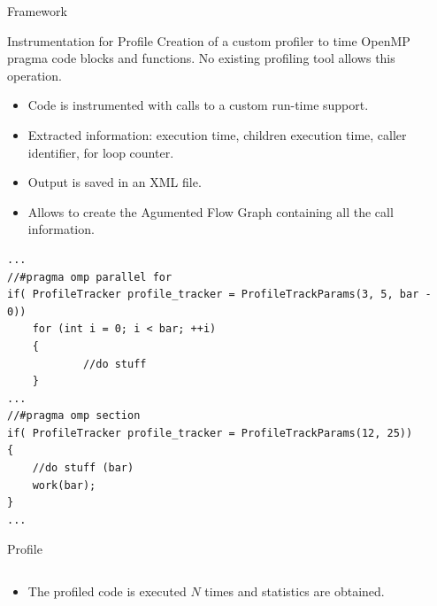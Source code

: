 \documentclass[xcolor=dvipsnames]{beamer}
\begin{document}
\begin{section}{Framework}














\begin{frame}[fragile]{\hskip 0.3cm Instrumentation for Profile}
 Creation of a custom profiler to time OpenMP pragma code blocks and functions.  No existing profiling tool allows this operation.

\begin{itemize}

\item Code is instrumented with calls to a custom run-time support.

\item Extracted information: execution time, children execution time, caller identifier, for loop counter.

\item Output is saved in an XML file.

\item Allows to create the Agumented Flow Graph containing all the call information.

\end{itemize}


\begin{lstlisting}[language=CCC]
...
//#pragma omp parallel for
if( ProfileTracker profile_tracker = ProfileTrackParams(3, 5, bar - 0))
	for (int i = 0; i < bar; ++i)
	{
    		//do stuff
	}
...
//#pragma omp section
if( ProfileTracker profile_tracker = ProfileTrackParams(12, 25))
{
    //do stuff (bar)
    work(bar);
}
...
\end{lstlisting}

\end{frame}












\begin{frame}{\hskip 0.3cm Profile}

\begin{columns}

\begin{column}{5cm}
\begin{itemize}

\item The profiled code is executed $N$ times and statistics are obtained. 


\end{itemize}
\end{column}
\end{columns}
\end{frame}
\end{section}
\end{document}
